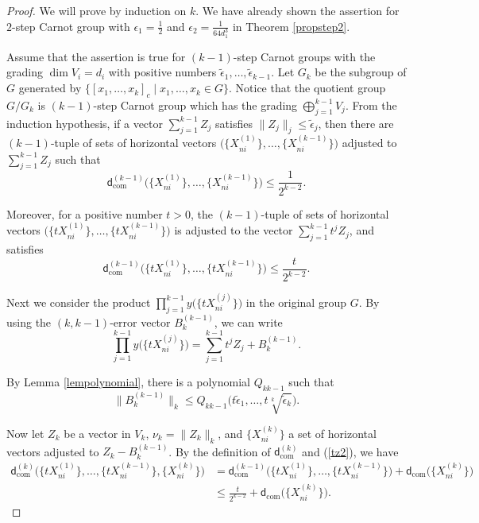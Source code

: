 \documentclass[pdftex]{sigma}
\numberwithin{equation}{section}
\begin{document}
\begin{proof}
 We will prove by induction on $k$.
 We have already shown the assertion for $2$-step Carnot group with $\epsilon_1=\frac{1}{2}$ and $\epsilon_2=\frac{1}{64d_1^3}$ in Theorem \ref{propstep2}.

 Assume that the assertion is true for $(k-1)$-step Carnot groups with the grading $\dim V_i=d_i$ with positive numbers $\tilde{\epsilon}_1,\dots,\tilde{\epsilon}_{k-1}$.
 Let $G_k$ be the subgroup of $G$ generated by $\{[x_1,\dots,x_k]_c\mid x_1,\dots,x_k\in G\}$.
 Notice that the quotient group $G/G_k$ is $(k-1)$-step Carnot group which has the grading $\bigoplus_{j=1}^{k-1}V_j$.
 From the induction hypothesis,
 if a vector $\sum_{j=1}^{k-1}Z_j$ satisfies $\|Z_j\|_j\leq \tilde{\epsilon}_j$,
 then there are $(k-1)$-tuple of sets of horizontal vectors $\big(\bigl\{X_{ni}^{(1)}\bigr\},\dots,\bigl\{X_{ni}^{(k-1)}\bigr\}\big)$ adjusted to $\sum_{j=1}^{k-1}Z_j$ such that
 \[
 \mathsf{d}_{\mathrm{com}}^{(k-1)}\big(\bigl\{X_{ni}^{(1)}\bigr\}, \dots,\bigl\{X_{ni}^{(k-1)}\bigr\}\big)\leq \frac{1}{2^{k-2}}.
 \]

 Moreover,
 for a positive number $t>0$,
 the $(k-1)$-tuple of sets of horizontal vectors $\big(\bigl\{tX_{ni}^{(1)}\bigr\},\dots,\bigl\{tX_{ni}^{(k-1)}\bigr\}\big)$ is adjusted to the vector $\sum_{j=1}^{k-1}t^jZ_j$,
 and satisfies
 \begin{equation}\label{tz2}
 \mathsf{d}_{\mathrm{com}}^{(k-1)}\big(\bigl\{tX_{ni}^{(1)}\bigr\},\dots,\bigl\{tX_{ni}^{(k-1)}\bigr\}\big)\leq \frac{t}{2^{k-2}}.
 \end{equation}

 Next we consider the product $\prod_{j=1}^{k-1}y\big(\bigl\{tX_{ni}^{(j)}\bigr\}\big)$ in the original group $G$.
 By using the \mbox{$(k,k-1)$}-error vector $B_k^{(k-1)}$,
 we can write
 \[
 \prod_{j=1}^{k-1}y\big(\bigl\{tX_{ni}^{(j)}\bigr\}\big)=\sum_{j=1}^{k-1}t^jZ_j+B_k^{(k-1)}.
 \]

By Lemma \ref{lempolynomial},
there is a polynomial $Q_{kk-1}$ such that
\[
\big\|B_k^{(k-1)}\big\|_k\leq Q_{kk-1}\bigl(t\tilde{\epsilon}_1,\dots,t\sqrt[k]{\tilde{\epsilon}_{k}}\bigr).
\]

 Now let $Z_k$ be a vector in $V_k$,
 $\nu_k=\|Z_k\|_k$,
 and $\bigl\{X_{ni}^{(k)}\bigr\}$ a set of horizontal vectors adjusted to $Z_k-B_k^{(k-1)}$.
 By the definition of $\mathsf{d}_{\mathrm{com}}^{(k)}$ and (\ref{tz2}),
 we have
 \begin{align*}
 \mathsf{d}_{\mathrm{com}}^{(k)}\big(\bigl\{tX_{ni}^{(1)}\bigr\}, \dots,\bigl\{tX_{ni}^{(k-1)}\bigr\},\bigl\{X_{ni}^{(k)}\bigr\}\big)
 &=\mathsf{d}_{\mathrm{com}}^{(k-1)}\big(\bigl\{tX_{ni}^{(1)}\bigr\}, \dots,\bigl\{tX_{ni}^{(k-1)}\bigr\}\big)+\mathsf{d}_{\mathrm{com}}\big(\bigl\{X_{ni}^{(k)}\bigr\}\big)
\\
& \leq \frac{t}{2^{k-2}}+\mathsf{d}_{\mathrm{com}}\big(\bigl\{X_{ni}^{(k)}\bigr\}\big).
 \end{align*}


\end{proof}
\end{document}
